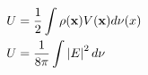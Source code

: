 \begin{align*}
	U &= \frac{1}{2} \int \rho({\bf x})V({\bf x}) d\nu(x) \\
	U &= \frac{1}{8\pi} \int \left|E\right|^2 d\nu
\end{align*}
